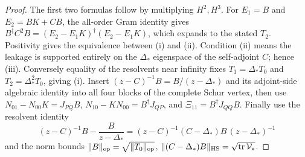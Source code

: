 \documentclass[12pt,a4paper]{article}
\begin{document}
\begin{proof}
The first two formulas follow by multiplying $H^2,H^3$.
For $E_1=B$ and $E_2=BK+CB$, the all-order Gram identity gives
$B^\dagger C^2B=(E_2-E_1K)^\dagger(E_2-E_1K)$,
which expands to the stated $T_2$. Positivity gives the equivalence
between (i) and (ii). Condition (ii) means the leakage is supported
entirely on the $\Delta_*$ eigenspace of the self-adjoint $C$;
hence (iii). Conversely equality of the resolvents near infinity
fixes $T_1=\Delta_*T_0$ and $T_2=\Delta_*^2T_0$, giving (i).
Insert $(z-C)^{-1}B=B/(z-\Delta_*)$ and its adjoint-side
algebraic identity into all four blocks of the complete Schur
vertex, then use $N_{01}-N_{00}K=J_{PQ}B$,
$N_{10}-KN_{00}=B^\dagger J_{QP}$, and
$\Xi_{11}=B^\dagger J_{QQ}B$.
Finally use the resolvent identity
\[
(z-C)^{-1}B-\frac{B}{z-\Delta_*}
 =(z-C)^{-1}(C-\Delta_*)B\,(z-\Delta_*)^{-1}
\]
and the norm bounds
$\|B\|_{\rm op}=\sqrt{\|T_0\|_{\rm op}}$,
$\|(C-\Delta_*)B\|_{\rm HS}=\sqrt{\operatorname{tr}\mathcal V_*}$.
\end{proof}
\end{document}
